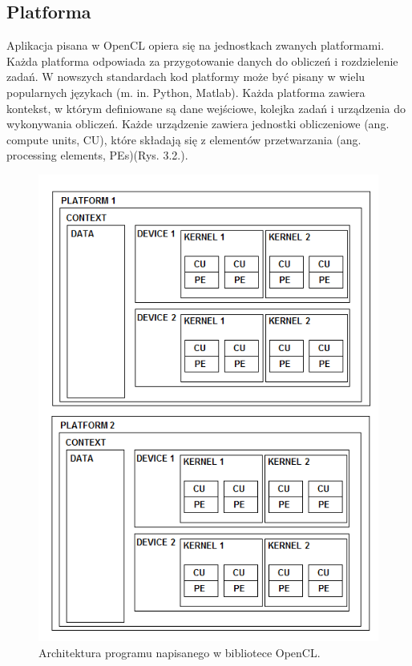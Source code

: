 \subsection{Platforma}\label{sec:platforma}

Aplikacja pisana w OpenCL opiera się na jednostkach zwanych platformami. Każda platforma odpowiada za przygotowanie danych do obliczeń i rozdzielenie zadań. W nowszych standardach kod platformy może być pisany w wielu popularnych językach  (m. in. Python, Matlab). Każda platforma zawiera kontekst, w którym definiowane są dane wejściowe, kolejka zadań i urządzenia do wykonywania obliczeń. Każde urządzenie zawiera jednostki obliczeniowe (ang. compute units, CU), które składają się z elementów przetwarzania (ang. processing elements, PEs)(Rys. 3.2.). 

\begin{figure}[h]
        \centering
                \centering
                \includegraphics[width=12cm]{rys8}
	\caption{Architektura programu napisanego w bibliotece OpenCL.}
\end{figure}

